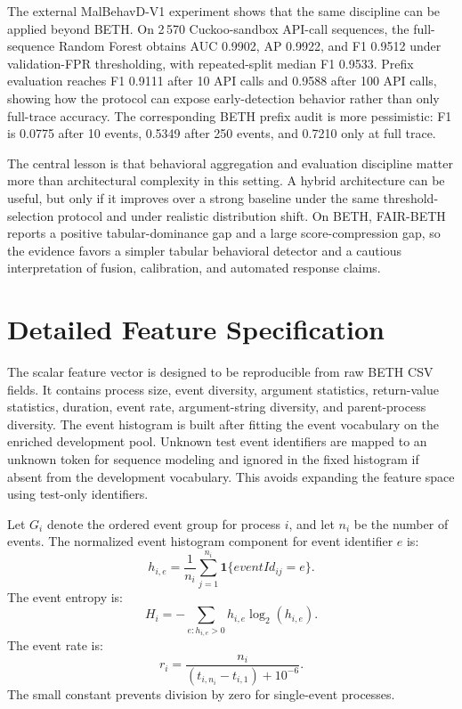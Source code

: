 \documentclass[journal]{IEEEtran}
\begin{document}
The external MalBehavD-V1 experiment shows that the same discipline can be applied beyond BETH. On 2\,570 Cuckoo-sandbox API-call sequences, the full-sequence Random Forest obtains AUC 0.9902, AP 0.9922, and F1 0.9512 under validation-FPR thresholding, with repeated-split median F1 0.9533. Prefix evaluation reaches F1 0.9111 after 10 API calls and 0.9588 after 100 API calls, showing how the protocol can expose early-detection behavior rather than only full-trace accuracy. The corresponding BETH prefix audit is more pessimistic: F1 is 0.0775 after 10 events, 0.5349 after 250 events, and 0.7210 only at full trace.

The central lesson is that behavioral aggregation and evaluation discipline matter more than architectural complexity in this setting. A hybrid architecture can be useful, but only if it improves over a strong baseline under the same threshold-selection protocol and under realistic distribution shift. On BETH, FAIR-BETH reports a positive tabular-dominance gap and a large score-compression gap, so the evidence favors a simpler tabular behavioral detector and a cautious interpretation of fusion, calibration, and automated response claims.

\appendices

\section{Detailed Feature Specification}
\label{app:features}

The scalar feature vector is designed to be reproducible from raw BETH CSV fields. It contains process size, event diversity, argument statistics, return-value statistics, duration, event rate, argument-string diversity, and parent-process diversity. The event histogram is built after fitting the event vocabulary on the enriched development pool. Unknown test event identifiers are mapped to an unknown token for sequence modeling and ignored in the fixed histogram if absent from the development vocabulary. This avoids expanding the feature space using test-only identifiers.

Let $G_i$ denote the ordered event group for process $i$, and let $n_i$ be the number of events. The normalized event histogram component for event identifier $e$ is:
\[
h_{i,e}=\frac{1}{n_i}\sum_{j=1}^{n_i}\mathbf{1}\{eventId_{ij}=e\}.
\]
The event entropy is:
\[
H_i=-\sum_{e:h_{i,e}>0}h_{i,e}\log_2(h_{i,e}).
\]
The event rate is:
\[
r_i=\frac{n_i}{(t_{i,n_i}-t_{i,1})+10^{-6}}.
\]
The small constant prevents division by zero for single-event processes.
\end{document}
